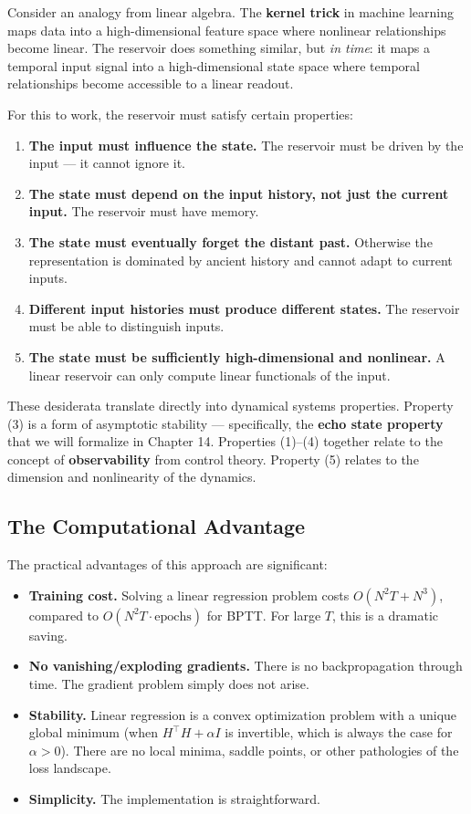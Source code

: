 Consider an analogy from linear algebra. The \textbf{kernel trick} in machine learning maps data into a high-dimensional feature space where nonlinear relationships become linear. The reservoir does something similar, but \textit{in time}: it maps a temporal input signal into a high-dimensional state space where temporal relationships become accessible to a linear readout.

For this to work, the reservoir must satisfy certain properties:

\begin{enumerate}[nosep]
  \item \textbf{The input must influence the state.} The reservoir must be driven by the input --- it cannot ignore it.
  \item \textbf{The state must depend on the input history, not just the current input.} The reservoir must have memory.
  \item \textbf{The state must eventually forget the distant past.} Otherwise the representation is dominated by ancient history and cannot adapt to current inputs.
  \item \textbf{Different input histories must produce different states.} The reservoir must be able to distinguish inputs.
  \item \textbf{The state must be sufficiently high-dimensional and nonlinear.} A linear reservoir can only compute linear functionals of the input.
\end{enumerate}

These desiderata translate directly into dynamical systems properties. Property (3) is a form of asymptotic stability --- specifically, the \textbf{echo state property} that we will formalize in Chapter 14. Properties (1)--(4) together relate to the concept of \textbf{observability} from control theory. Property (5) relates to the dimension and nonlinearity of the dynamics.

\subsection{The Computational Advantage}\label{sec:13.4.3}

The practical advantages of this approach are significant:

\begin{itemize}[nosep]
  \item \textbf{Training cost.} Solving a linear regression problem costs $O(N^2 T + N^3)$, compared to $O(N^2 T \cdot \text{epochs})$ for BPTT. For large $T$, this is a dramatic saving.
  \item \textbf{No vanishing/exploding gradients.} There is no backpropagation through time. The gradient problem simply does not arise.
  \item \textbf{Stability.} Linear regression is a convex optimization problem with a unique global minimum (when $H^\top H + \alpha I$ is invertible, which is always the case for $\alpha > 0$). There are no local minima, saddle points, or other pathologies of the loss landscape.
  \item \textbf{Simplicity.} The implementation is straightforward.
\end{itemize}

